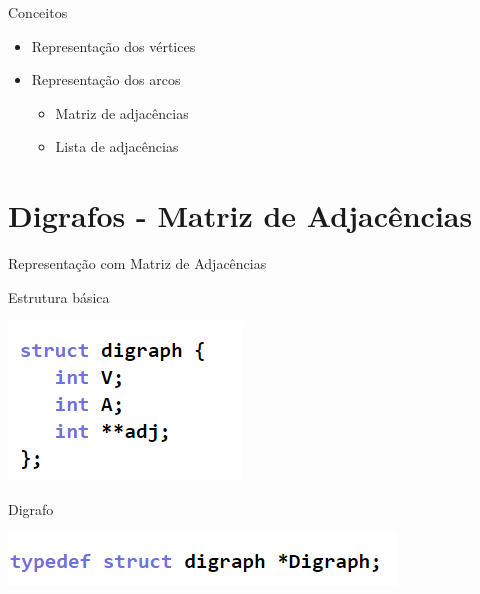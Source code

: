 \documentclass[xcolor=dvipsnames,table]{beamer}
\begin{document}
	\begin{frame}{Conceitos}
		\begin{itemize}
			\item Representação dos vértices \pause
			\item Representação dos arcos \pause
				\begin{itemize}
					\item Matriz de adjacências \pause
					\item Lista de adjacências
				\end{itemize}
		\end{itemize}
	\end{frame}
	
	\section{Digrafos - Matriz de Adjacências}
	\begin{frame}{Representação com Matriz de Adjacências}
		\begin{block}{Estrutura básica}
			\begin{center}
	    		\includegraphics[height=.25\textheight]{images/digrafo.png}
	  		\end{center}
		\end{block} \pause
		\begin{block}{Digrafo}
			\begin{center}
	    		\includegraphics[height=.1\textheight]{images/digrafo-ponteiro.png}
	  		\end{center}
		\end{block}
	\end{frame}
	
\end{document}
